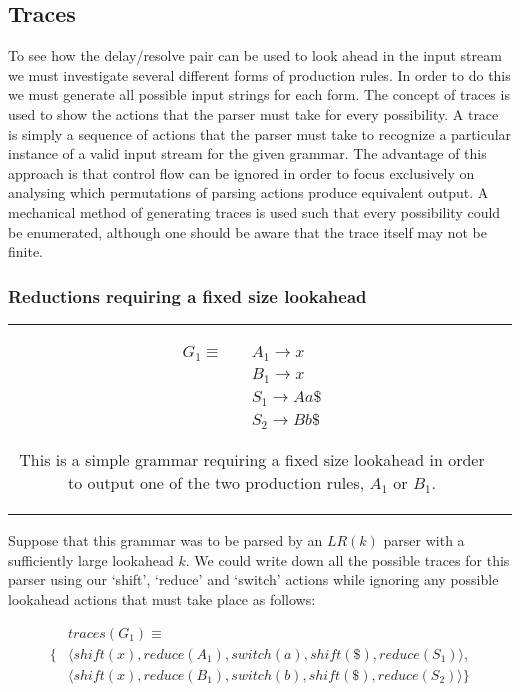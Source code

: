 \documentclass[a4paper,11pt]{article}
\begin{document}
\subsection{Traces}
To see how the delay/resolve pair can be used to look ahead in the input stream we must investigate several different forms of production rules.
In order to do this we must generate all possible input strings for each form.
The concept of traces is used to show the actions that the parser must take for every possibility.
A trace is simply a sequence of actions that the parser must take to recognize a particular instance of a valid input stream for the given grammar.
The advantage of this approach is that control flow can be ignored in order to focus exclusively on analysing which permutations of parsing actions produce equivalent output.
A mechanical method of generating traces is used such that every possibility could be enumerated, although one should be aware that the trace itself may not be finite.\\

\subsubsection{Reductions requiring a fixed size lookahead}
\begin{tabular}[t]{cl}
\parbox{.3\textwidth}{
\begin{align*}
G_1 \equiv \quad & A_1 \rightarrow x\\
                 & B_1 \rightarrow x\\
                 & S_1 \rightarrow A a \$\\
                 & S_2 \rightarrow B b \$
\end{align*}}
\parbox{.6\textwidth}{This is a simple grammar requiring a fixed size lookahead in order to output one of the two production rules, $A_1$ or $B_1$.}
\end{tabular}

Suppose that this grammar was to be parsed by an $LR(k)$ parser with a sufficiently large lookahead $k$. 
We could write down all the possible traces for this parser using our `shift', `reduce' and `switch' actions while ignoring any possible lookahead actions that must take place as follows:

{\small\parbox{.25\textwidth}{\begin{align*}
&traces(G_1) \equiv \\
\{ & \langle shift(x), reduce(A_1), switch(a), shift(\$), reduce(S_1) \rangle,\\
   & \langle shift(x), reduce(B_1), switch(b), shift(\$), reduce(S_2) \rangle \}
\end{align*}}}
\end{document}
